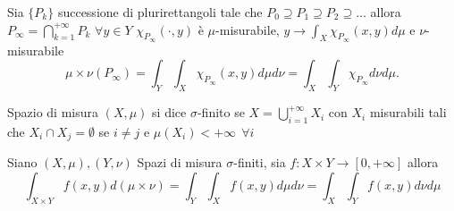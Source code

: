 \documentclass[12px]{article}
\begin{document}
	\begin{lemm}
		Sia $\{P_k\}$ successione di plurirettangoli tale che  $P_0\supseteq P_1\supseteq P_2\supseteq\ldots$ allora $P_\infty = \bigcap^{+\infty}_{k=1}P_k$ $\forall y\in Y$  $\chi_{P_\infty}(\cdot, y)$  è $\mu$-misurabile, $y \rightarrow \int_X\chi_{P_\infty}(x,y)d\mu$ e $\nu$-misurabile
		\[
			\mu\times\nu(P_\infty) = \int_Y\int_X \chi_{P_\infty}(x,y)d\mu d\nu = \int_X\int_Y \chi_{P_\infty} d\nu d\mu
		.\] 
	\end{lemm}
	\begin{defi}
		Spazio di misura $(X,\mu)$ si dice  $\sigma$-finito se $X = \bigcup^{+\infty}_{i=1}X_i$ con $X_i$ misurabili tali che  $X_i\cap X_j = \emptyset$ se  $i\neq j$ e  $\mu(X_i) < +\infty\ \ \forall i$
	\end{defi}
	\begin{teo}[Tonelli]
		Siano $(X,\mu), (Y,\nu)$ Spazi di misura $\sigma$-finiti, sia $f:X\times Y \rightarrow [0,+\infty]$ allora \[\int_{X\times Y}f(x,y)d(\mu\times\nu) = \int_Y\int_X f(x,y)d\mu d\nu = \int_X\int_Yf(x,y)d\nu d\mu\]
	\end{teo}
\end{document}
